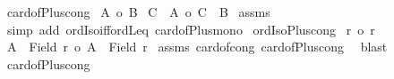 \begin{isabellebody}
\isamarkupfalse%
\ card{\isacharunderscore}{\kern0pt}of{\isacharunderscore}{\kern0pt}Plus{\isacharunderscore}{\kern0pt}cong{}{\isacharcolon}{\kern0pt}\isanewline
{}\ {\isachardoublequoteopen}{\isacharbar}{\kern0pt}A{\isacharbar}{\kern0pt}\ {\isacharequal}{\kern0pt}o\ {\isacharbar}{\kern0pt}B{\isacharbar}{\kern0pt}{\isachardoublequoteclose}\isanewline
{}\ {\isachardoublequoteopen}{\isacharbar}{\kern0pt}C\ {\isacharless}{\kern0pt}{\isacharplus}{\kern0pt}{\isachargreater}{\kern0pt}\ A{\isacharbar}{\kern0pt}\ {\isacharequal}{\kern0pt}o\ {\isacharbar}{\kern0pt}C\ {\isacharless}{\kern0pt}{\isacharplus}{\kern0pt}{\isachargreater}{\kern0pt}\ B{\isacharbar}{\kern0pt}{\isachardoublequoteclose}\isanewline
%
\isadelimproof
%
\endisadelimproof
%
\isatagproof
{}\isamarkupfalse%
\ assms\ \isamarkupfalse%
\ {\isacharparenleft}{\kern0pt}simp\ add{\isacharcolon}{\kern0pt}\ ordIso{\isacharunderscore}{\kern0pt}iff{\isacharunderscore}{\kern0pt}ordLeq\ card{\isacharunderscore}{\kern0pt}of{\isacharunderscore}{\kern0pt}Plus{\isacharunderscore}{\kern0pt}mono{}{\isacharparenright}{\kern0pt}%
\endisatagproof
{\isafoldproof}%
%
\isadelimproof
\isanewline
%
\endisadelimproof
\isanewline
{}\isamarkupfalse%
\ ordIso{\isacharunderscore}{\kern0pt}Plus{\isacharunderscore}{\kern0pt}cong{}{\isacharcolon}{\kern0pt}\isanewline
{}\ {\isachardoublequoteopen}r\ {\isacharequal}{\kern0pt}o\ r{\isacharprime}{\kern0pt}{\isachardoublequoteclose}\isanewline
{}\ {\isachardoublequoteopen}{\isacharbar}{\kern0pt}A\ {\isacharless}{\kern0pt}{\isacharplus}{\kern0pt}{\isachargreater}{\kern0pt}\ {\isacharparenleft}{\kern0pt}Field\ r{\isacharparenright}{\kern0pt}{\isacharbar}{\kern0pt}\ {\isacharequal}{\kern0pt}o\ {\isacharbar}{\kern0pt}A\ {\isacharless}{\kern0pt}{\isacharplus}{\kern0pt}{\isachargreater}{\kern0pt}\ {\isacharparenleft}{\kern0pt}Field\ r{\isacharprime}{\kern0pt}{\isacharparenright}{\kern0pt}{\isacharbar}{\kern0pt}{\isachardoublequoteclose}\isanewline
%
\isadelimproof
%
\endisadelimproof
%
\isatagproof
{}\isamarkupfalse%
\ assms\ card{\isacharunderscore}{\kern0pt}of{\isacharunderscore}{\kern0pt}cong\ card{\isacharunderscore}{\kern0pt}of{\isacharunderscore}{\kern0pt}Plus{\isacharunderscore}{\kern0pt}cong{}\ \isamarkupfalse%
\ blast%
\endisatagproof
{\isafoldproof}%
%
\isadelimproof
\isanewline
%
\endisadelimproof
\isanewline
{}\isamarkupfalse%
\ card{\isacharunderscore}{\kern0pt}of{\isacharunderscore}{\kern0pt}Plus{\isacharunderscore}{\kern0pt}cong{\isacharcolon}{\kern0pt}\isanewline

\end{isabellebody}
